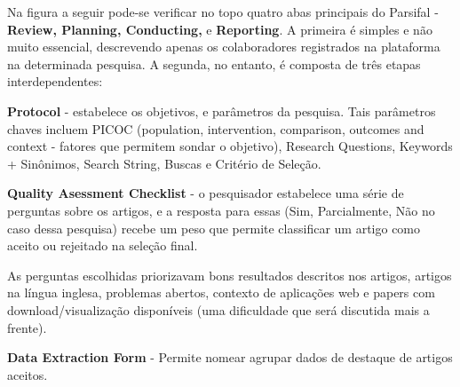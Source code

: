 \bigskip

Na figura a seguir pode-se verificar no topo quatro abas principais do Parsifal \cite{parsifal_docs} - \textbf{Review, Planning, Conducting, }e \textbf{Reporting}. A primeira é simples e não muito essencial, descrevendo apenas os colaboradores registrados na plataforma na determinada pesquisa. A segunda, no entanto, é composta de três etapas interdependentes:

\begin{alineas}

\item \textbf{Protocol} - estabelece os objetivos, e parâmetros da pesquisa. Tais parâmetros chaves incluem PICOC (population, intervention, comparison, outcomes and context - fatores que permitem sondar o objetivo), Research Questions, Keywords + Sinônimos, Search String, Buscas e Critério de Seleção.

\item \textbf{Quality Asessment Checklist} - o pesquisador estabelece uma série de perguntas sobre os artigos, e a resposta para essas (Sim, Parcialmente, Não no caso dessa pesquisa) recebe um peso que permite classificar um artigo como aceito ou rejeitado na seleção final. 

As perguntas escolhidas priorizavam bons resultados descritos nos artigos, artigos na língua inglesa, problemas abertos, contexto de aplicações web e papers com download/visualização disponíveis (uma dificuldade que será discutida mais a frente).

\item \textbf{Data Extraction Form} - Permite nomear agrupar dados de destaque de artigos aceitos.

\end{alineas}

